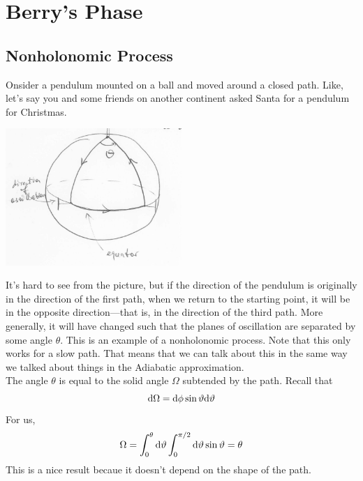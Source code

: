 \documentclass[a4paper]{article}
\begin{document}
\section{Berry's Phase}
\subsection{Nonholonomic Process}
Onsider a pendulum mounted on a ball and moved around a closed path. Like,
let's say you and some friends on another continent  asked Santa for a pendulum
for Christmas.
\begin{center}
	\includegraphics[width=0.5\textwidth]{santa.png}
\end{center}
It's hard to see from the picture, but if the direction of the pendulum is
originally in the direction of the first path, when we return to the starting
point, it will be in the opposite direction---that is, in the direction of the
third path. More generally, it will have changed such that the planes of
oscillation are separated by some angle $\theta$.
This is an example of a nonholonomic process. Note that this only
works for a slow path. That means that we can talk about this in the same way
we talked about things in the Adiabatic approximation.\\
The angle $\theta$ is equal to the solid angle $\Omega$ subtended by the path.
Recall that
\[
	\mathrm{d}\Omega = \mathrm{d}\phi\sin\vartheta\mathrm{d}\vartheta
\]
For us,
\[
	\Omega = \int_0^\theta\mathrm{d}\vartheta\int_0^{\pi/2} \mathrm{d}\vartheta
	\sin\vartheta =	\theta
\]
This is a nice result becaue it doesn't depend on the shape of the path.
\end{document}
